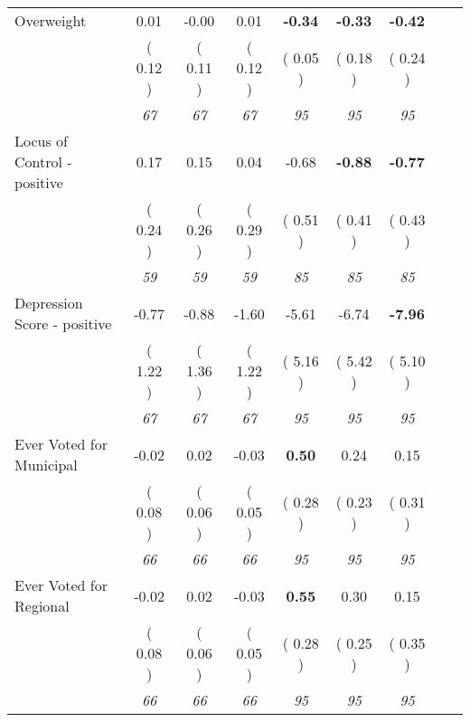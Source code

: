 \begin{tabular}{l c c c c c c c c}
Overweight &      0.01 &     -0.00 &      0.01 & \textbf{     -0.34 } & \textbf{     -0.33 } & \textbf{     -0.42 } \\
& (     0.12 ) & (     0.11 ) & (     0.12 ) & (     0.05 ) & (     0.18 ) & (     0.24 ) \\
& \textit{ 67 } & \textit{ 67 } & \textit{ 67 } & \textit{ 95 } & \textit{ 95 } & \textit{ 95 } \\
Locus of Control - positive &      0.17 &      0.15 &      0.04 &     -0.68 & \textbf{     -0.88 } & \textbf{     -0.77 } \\
& (     0.24 ) & (     0.26 ) & (     0.29 ) & (     0.51 ) & (     0.41 ) & (     0.43 ) \\
& \textit{ 59 } & \textit{ 59 } & \textit{ 59 } & \textit{ 85 } & \textit{ 85 } & \textit{ 85 } \\
Depression Score - positive &     -0.77 &     -0.88 &     -1.60 &     -5.61 &     -6.74 & \textbf{     -7.96 } \\
& (     1.22 ) & (     1.36 ) & (     1.22 ) & (     5.16 ) & (     5.42 ) & (     5.10 ) \\
& \textit{ 67 } & \textit{ 67 } & \textit{ 67 } & \textit{ 95 } & \textit{ 95 } & \textit{ 95 } \\
Ever Voted for Municipal &     -0.02 &      0.02 &     -0.03 & \textbf{      0.50 } &      0.24 &      0.15 \\
& (     0.08 ) & (     0.06 ) & (     0.05 ) & (     0.28 ) & (     0.23 ) & (     0.31 ) \\
& \textit{ 66 } & \textit{ 66 } & \textit{ 66 } & \textit{ 95 } & \textit{ 95 } & \textit{ 95 } \\
Ever Voted for Regional &     -0.02 &      0.02 &     -0.03 & \textbf{      0.55 } &      0.30 &      0.15 \\
& (     0.08 ) & (     0.06 ) & (     0.05 ) & (     0.28 ) & (     0.25 ) & (     0.35 ) \\
& \textit{ 66 } & \textit{ 66 } & \textit{ 66 } & \textit{ 95 } & \textit{ 95 } & \textit{ 95 } \\
\bottomrule
\end{tabular}
